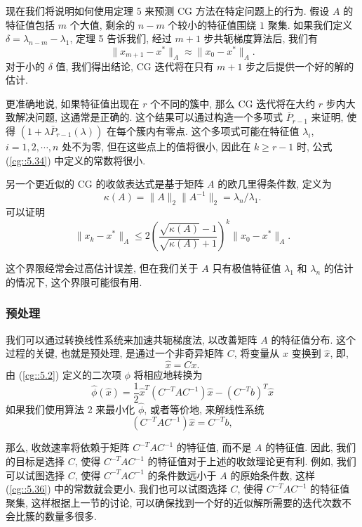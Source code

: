 \documentclass[a4paper]{ctexart}
\begin{document}
{现在我们将说明如何使用定理 5 来预测 CG 方法在特定问题上的行为. 
假设 $A$ 的特征值包括 $m$ 个大值, 剩余的 $n - m$ 个较小的特征值围绕 $1$ 聚集. 
如果我们定义 $\delta = \lambda_{n-m} - \lambda_1$, 
定理 5 告诉我们, 经过 $m + 1$ 步共轭梯度算法后, 我们有
$$
\|x_{m+1} - x^*\|_A \approx \|x_0 - x^*\|_A.
$$
对于小的 $\delta$ 值, 我们得出结论, CG 迭代将在只有 $m + 1$ 
步之后提供一个好的解的估计.

更准确地说, 如果特征值出现在 $r$ 个不同的簇中, 
那么 CG 迭代将在大约 $r$ 步内大致解决问题, 
这通常是正确的. 这个结果可以通过构造一个多项式 
$\bar{P}_{r-1}$ 来证明, 使得 
$(1+\lambda\bar{P}_{r-1}(\lambda))$ 
在每个簇内有零点. 这个多项式可能在特征值 
$\lambda_i$, $i = 1, 2, \cdots, n$ 处不为零, 
但在这些点上的值将很小, 因此在 $k \geq r - 1$ 时, 公式 (\ref{cg::5.34}) 
中定义的常数将很小. 

另一个更近似的 CG 的收敛表达式是基于矩阵 $A$ 的欧几里得条件数, 定义为
$$
\kappa(A) = \|A\|_2 \|A^{-1}\|_2 = \lambda_n/\lambda_1.
$$
可以证明
\begin{equation}
\|x_k - x^*\|_A 
\leq 2 \left( \frac{\sqrt{\kappa(A)} - 1}{\sqrt{\kappa(A)} + 1} \right) ^k \|x_0 - x^*\|_A.
 \label{cg::5.36}
\end{equation}

这个界限经常会过高估计误差, 但在我们关于 $A$ 只有极值特征值 $\lambda_1$ 
和 $\lambda_n$ 的估计的情况下, 这个界限可能很有用. 

\subsubsection*{预处理}
我们可以通过转换线性系统来加速共轭梯度法, 以改善矩阵 $A$ 的特征值分布. 
这个过程的关键, 也就是预处理, 是通过一个非奇异矩阵 $C$, 将变量从 $x$ 变换到 $\hat{x}$, 
即, 
\begin{equation}
  \hat{x} = C x. 
  \label{cg::5.37}
\end{equation}
由 (\ref{cg::5.2}) 定义的二次项 $\phi$ 将相应地转换为 
\begin{equation}
  \hat{\phi}(\hat{x}) = \frac{1}{2}\hat{x}^T (C^{-T} AC^{-1} )\hat{x} - (C^{-T}b)^T \hat{x}
  \label{cg::5.38}
\end{equation}
如果我们使用算法 2 来最小化 $\hat{\phi}$, 或者等价地, 来解线性系统 
$$
(C^{-T} AC^{-1} )\hat{x} = C^{-T} b,
$$

那么, 收敛速率将依赖于矩阵 $C^{-T} AC^{-1}$ 的特征值, 
而不是 $A$ 的特征值. 因此, 我们的目标是选择 $C$, 
使得 $C^{-T} AC^{-1}$ 的特征值对于上述的收敛理论更有利. 
例如, 我们可以试图选择 $C$, 使得 $C^{-T} AC^{-1}$ 
的条件数远小于 $A$ 的原始条件数, 这样 (\ref{cg::5.36}) 中的常数就会更小. 
我们也可以试图选择 $C$, 使得 $C^{-T} AC^{-1}$ 的特征值聚集, 
这样根据上一节的讨论, 可以确保找到一个好的近似解所需要的迭代次数不会比簇的数量多很多.

}
\end{document}
